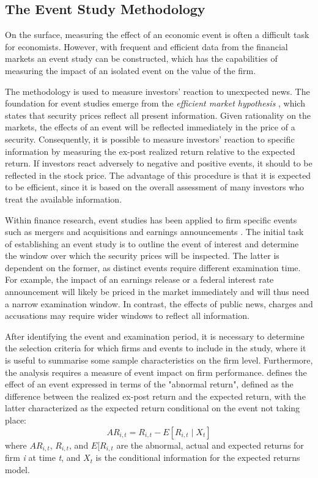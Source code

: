 \subsection{The Event Study Methodology}

On the surface, measuring the effect of an economic event is often a difficult task for economists. However, with frequent and efficient data from the financial markets an event study can be constructed, which has the capabilities of measuring the impact of an isolated event on the value of the firm. 


The methodology is used to measure investors' reaction to unexpected news. The foundation for event studies emerge from the \textit{efficient market hypothesis} \citep{fama1969_EMH}, which states that security prices reflect all present information. Given rationality on the markets, the effects of an event will be reflected immediately in the price of a security. Consequently, it is possible to measure investors' reaction to specific information by measuring the ex-post realized return relative to the expected return. If investors react adversely to negative and positive events, it should to be reflected in the stock price. The advantage of this procedure is that it is expected to be efficient, since it is based on the overall assessment of many investors who treat the available information. 

Within finance research, event studies has been applied to firm specific events such as mergers and acquisitions and earnings announcements \citep{Event_studies}. The initial task of establishing an event study is to outline the event of interest and determine the window over which the security prices will be inspected. The latter is dependent on the former, as distinct events require different examination time. For example, the impact of an earnings release or a federal interest rate announcement will likely be priced in the market immediately and will thus need a narrow examination window. In contrast, the effects of public news, charges and accusations may require wider windows to reflect all information. 

After identifying the event and examination period, it is necessary to determine the selection criteria for which firms and events to include in the study, where it is useful to summarise some sample characteristics on the firm level. Furthermore, the analysis requires a measure of event impact on firm performance. \cite{Event_studies} defines the effect of an event expressed in terms of the "abnormal return", defined as the difference between the realized ex-post return and the expected return, with the latter characterized as the expected return conditional on the event not taking place: 
\begin{equation}
    AR_{i,t} = R_{i,t} - E[R_{i,t} \mid X_t ]
\end{equation}
where $AR_{i,t}$, $R_{i,t}$, and $E[R_{i,t}$ are the abnormal, actual and expected returns for firm \textit{i} at time \textit{t}, and $X_t$ is the conditional information for the expected returns model. 

